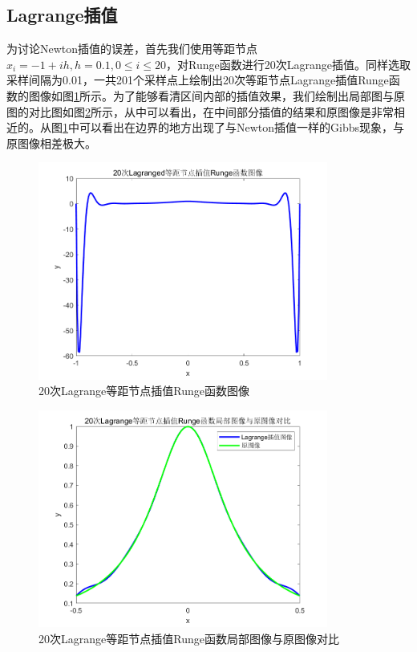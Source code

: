 \documentclass[a4paper]{article}
\begin{document}
\subsection{Lagrange插值}
为讨论Newton插值的误差，首先我们使用等距节点$x_i=-1+ih,h=0.1,0\le i\le 20$，对Runge函数进行20次Lagrange插值。同样选取采样间隔为0.01，一共201个采样点上绘制出20次等距节点Lagrange插值Runge函数的图像如图\ref{fig:4}所示。为了能够看清区间内部的插值效果，我们绘制出局部图与原图的对比图如图\ref{fig:5}所示，从中可以看出，在中间部分插值的结果和原图像是非常相近的。从图\ref{fig:4}中可以看出在边界的地方出现了与Newton插值一样的Gibbs现象，与原图像相差极大。


\begin{figure}[!h]
	\centering
	\includegraphics[width=0.85\textwidth]{../code/result/lagrunge}
	\caption{\label{fig:4}20次Lagrange等距节点插值Runge函数图像}
\end{figure}

\begin{figure}[!h]
	\centering
	\includegraphics[width=0.85\textwidth]{../code/result/lagrunge2}
	\caption{\label{fig:5}20次Lagrange等距节点插值Runge函数局部图像与原图像对比}
\end{figure}
\end{document}
